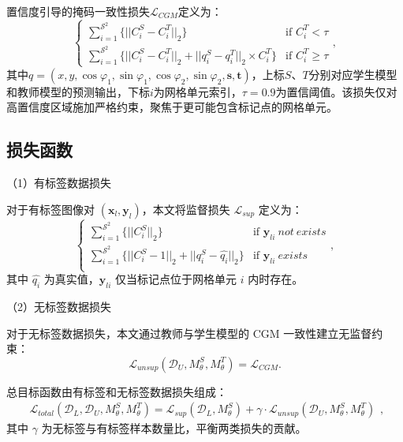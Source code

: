 置信度引导的掩码一致性损失\(\mathcal{L}_{CGM}\)定义为：
\begin{equation}
\begin{cases}
\sum_{i=1}^{\mathcal{S}^{2}} \{ ||C_{i}^{S} - C_{i}^{T}||_2 \} & \text{if } C_{i}^{T} < \tau \\
\sum_{i=1}^{\mathcal{S}^{2}} \{ ||C_{i}^{S} - C_{i}^{T}||_2 + ||q_{i}^{S} - q_{i}^{T}||_2 \times C_{i}^{T} \} & \text{if } C_{i}^{T} \geq \tau
\end{cases}
,
\end{equation}
其中\(q = (x,y,\cos\varphi_1,\sin\varphi_1,\cos\varphi_2,\sin\varphi_2,\textbf{s},\textbf{t})\)，上标\(S\)、\(T\)分别对应学生模型和教师模型的预测输出，下标\(i\)为网格单元索引，\(\tau=0.9\)为置信阈值。该损失仅对高置信度区域施加严格约束，聚焦于更可能包含标记点的网格单元。 


\subsection{损失函数}
（1）有标签数据损失

对于有标签图像对 $({\textbf{x}}_{l},{\textbf{y}}_{l})$，本文将监督损失 $\mathcal{L}_{sup}$ 定义为：
\begin{equation}
\begin{cases}
\sum_{i=1}^{\mathcal{S}^{2}} \{ ||C_{i}^{S}||_2 \} & \text{if } \textbf{y}_{li} \ not \ exists \\
\sum_{i=1}^{\mathcal{S}^{2}} \{ ||C_{i}^{S} - 1||_2 + ||q_{i}^{S} - \hat{q_{i}}||_2 \} & \text{if } \textbf{y}_{li} \ exists \\
\end{cases}
,
\end{equation}%
其中 $\hat{q_{i}}$ 为真实值，$\textbf{y}_{li}$ 仅当标记点位于网格单元 $i$ 内时存在。

（2）无标签数据损失

对于无标签数据损失，本文通过教师与学生模型的 CGM 一致性建立无监督约束：
\begin{equation}
\mathcal{L}_{unsup}(\mathcal{D}_{U}, M_{\theta}^{S}, M_{\theta}^{T})=\mathcal{L}_{CGM}.
\end{equation}

总目标函数由有标签和无标签数据损失组成：
\begin{equation}
\begin{array}{l}
\mathcal{L}_{total}(\mathcal{D}_{L},\mathcal{D}_{U}, M_{\theta}^{S}, M_{\theta}^{T})= 
\mathcal{L}_{sup}(\mathcal{D}_{L}, M_{\theta}^{S})+ \gamma \cdot \mathcal{L}_{unsup}(\mathcal{D}_{U}, M_{\theta}^{S}, M_{\theta}^{T})
\end{array}
,
\end{equation}
其中 $\gamma$ 为无标签与有标签样本数量比，平衡两类损失的贡献。

